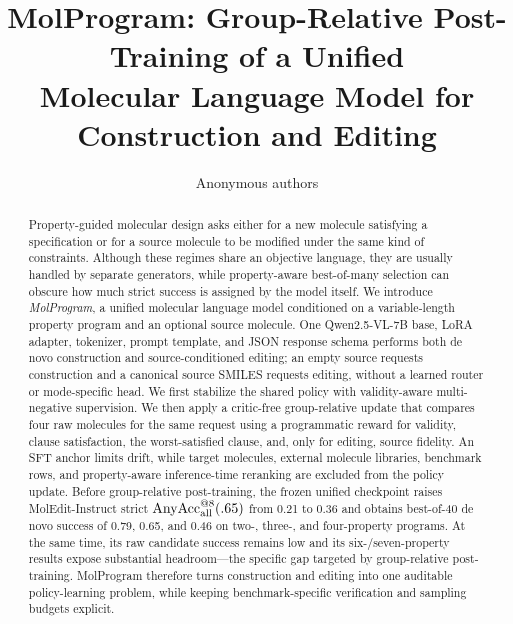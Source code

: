 \documentclass{article}
\title{MolProgram: Group-Relative Post-Training of a Unified\\
Molecular Language Model for Construction and Editing}
\author{Anonymous authors}
\begin{document}
\maketitle

\begin{abstract}
Property-guided molecular design asks either for a new molecule satisfying a
specification or for a source molecule to be modified under the same kind of
constraints. Although these regimes share an objective language, they are
usually handled by separate generators, while property-aware best-of-many
selection can obscure how much strict success is assigned by the model itself.
We introduce \emph{MolProgram}, a unified molecular language model conditioned
on a variable-length property program and an optional source molecule. One
Qwen2.5-VL-7B base, LoRA adapter, tokenizer, prompt template, and JSON response
schema performs both de novo construction and source-conditioned editing; an
empty source requests construction and a canonical source SMILES requests
editing, without a learned router or mode-specific head. We first stabilize the
shared policy with validity-aware multi-negative supervision. We then apply a
critic-free group-relative update that compares four raw molecules for the same
request using a programmatic reward for validity, clause satisfaction, the
worst-satisfied clause, and, only for editing, source fidelity. An SFT anchor
limits drift, while target molecules, external molecule libraries, benchmark
rows, and property-aware inference-time reranking are excluded from the policy
update. Before group-relative post-training, the frozen unified checkpoint
raises MolEdit-Instruct strict
$\operatorname{AnyAcc}_{\rm all}^{@8}(.65)$ from 0.21 to 0.36 and obtains
best-of-40 de novo success of 0.79, 0.65, and 0.46 on two-, three-, and
four-property programs. At the same time, its raw candidate success remains
low and its six-/seven-property results expose substantial headroom---the
specific gap targeted by group-relative post-training. MolProgram therefore
turns construction and editing into one auditable policy-learning problem,
while keeping benchmark-specific verification and sampling budgets explicit.
\end{abstract}
\end{document}
